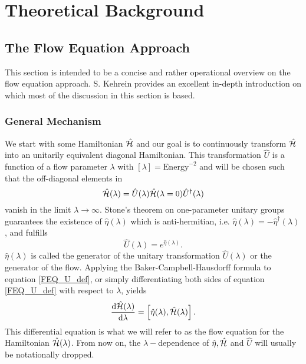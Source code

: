 \chapter{Theoretical Background}\label{Theoretical Background}
\section{The Flow Equation Approach}
This section is intended to be a concise and rather operational overview on the flow equation approach. S. Kehrein \cite{kehrein2006flow}  provides an excellent in-depth introduction on which most of the discussion in this section is based.
\subsection{General Mechanism}\label{General Mechanism}
We start with some Hamiltonian $\hat{\mathcal{H}}$ and our goal is to continuously transform $\hat{\mathcal{H}}$ into an unitarily equivalent diagonal Hamiltonian. This transformation $\hat U$ is a function of a flow parameter $\lambda$ with $\left[\lambda\right]=\mathrm{Energy}^{-2}$ and will be chosen such that the off-diagonal elements in  
\begin{equation}\label{FEQ_U_def}
\hat{\mathcal{H}}(\lambda)=\hat U(\lambda)\hat{\mathcal{H}} (\lambda = 0)\hat U^\dagger (\lambda)
\end{equation}
vanish in the limit $\lambda\rightarrow\infty$. Stone's theorem on one-parameter unitary groups \cite{doi:10.1073/pnas.16.2.172} guarantees the existence of $\hat \eta(\lambda)$ which is anti-hermitian, i.e. $\hat\eta(\lambda) = -\hat\eta^\dagger(\lambda)$, and fulfills 
\begin{equation}
\hat U(\lambda) = e^{\hat\eta(\lambda)}.
\end{equation} 
$\hat\eta(\lambda)$ is called the generator of the unitary transformation $\hat U(\lambda)$ or the generator of the flow. Applying the Baker-Campbell-Hausdorff formula to equation \ref{FEQ_U_def}, or simply differentiating both sides of equation \ref{FEQ_U_def} with respect to $\lambda$, yields
\begin{equation}\label{FEQ_ODE_def}
\frac{\mathrm d\hat{\mathcal{H}}(\lambda)}{\mathrm d\lambda} = \left[\hat\eta(\lambda),\hat{\mathcal{H}}(\lambda)\right].
\end{equation}
This differential equation is what we will refer to as the flow equation for the Hamiltonian $\hat{\mathcal{H}} (\lambda)$. From now on, the $\lambda-$dependence of $\hat\eta,\hat{\mathcal{H}}$ and $\hat U$ will usually be notationally dropped. \\
